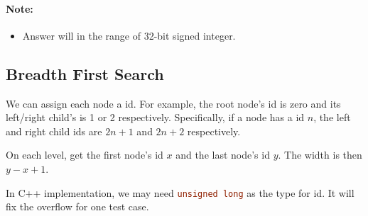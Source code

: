 \paragraph{Note:} 

\begin{itemize}
\item Answer will in the range of 32-bit signed integer.
\end{itemize}

\subsection{Breadth First Search}
We can assign each node a id. For example, the root node's id is zero and its left/right child's is 1 or 2 respectively. Specifically, if a node has a id $n$, the left and right child ids are $2n+1$ and $2n+2$ respectively.

On each level, get the first node's id $x$ and the last node's id $y$. The width is then $y-x+1$.

In C++ implementation, we may need  \lstinline[language=C++, basicstyle=\small\ttfamily, keywordstyle=\bfseries\color{green!40!black}]|unsigned long| as the type for id. It will fix the overflow for one test case.